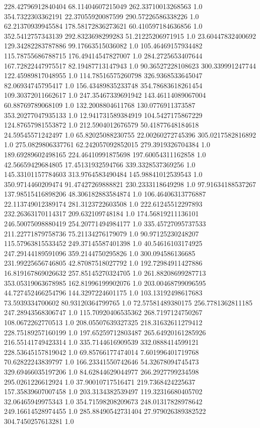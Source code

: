 228.42796912840404	68.11404607215049	262.33710013268563	1.0
354.7322303362191	22.37055920087599	290.57226586338226	1.0
62.21370939945584	178.58172836273621	60.410597184636856	1.0
352.5412757343139	292.8323698299283	51.21225206971915	1.0
23.60447832400692	129.34282283787886	99.17663515036082	1.0
105.46469157934482	115.78755686788715	176.49414547827007	1.0
284.2725653407644	167.72822447975517	82.19487713147943	1.0
90.36527228108623	300.339991247744	122.45989817048955	1.0
114.78516575260798	326.9368533645047	82.06934745795417	1.0
156.43489835233748	354.78683618261454	109.30372011662617	1.0
247.35467339691942	143.46114089067004	60.88769789068109	1.0
132.2008804611768	130.0776911373587	353.20277047935133	1.0
12.941731589384919	104.5427175867229	124.87657981553872	1.0
212.5904012676579	50.41877648184618	24.59545571242497	1.0
65.82025088230755	22.00260272745396	305.0217582816892	1.0
275.0829806337761	62.242057092852015	279.3919326704384	1.0
189.69289602498165	224.46410991875698	197.60054311162858	1.0
42.56659429684805	17.45131932594766	339.3328537369256	1.0
145.33101157784603	313.9764583490484	145.98841012539543	1.0
350.9714460209474	91.47427269888821	230.2333118649298	1.0
97.91634188537267	137.98515416898206	48.306182883584874	1.0
106.46406313776887	22.113749012389174	281.3123722603508	1.0
222.61245512297893	232.26363170114317	209.632109748184	1.0
174.56819211136101	246.50075098880419	254.20771494984177	1.0
335.45727095737533	211.22771879758736	75.21134276179079	1.0
90.97125230248207	115.57963815533452	249.37145587401398	1.0
40.54616103174925	247.29144189591096	359.2144750295826	1.0
300.094586136685	231.99225656746805	42.87087518027792	1.0
192.72984911427886	16.819167869026632	257.85145270324705	1.0
261.88208699287713	353.05319063678985	162.81996199902076	1.0
203.00468799096595	44.727452466254796	144.3297224601175	1.0
103.13192498617683	73.5939334700602	80.93120364799765	1.0
72.57581489380175	256.7781362811185	247.28943568306747	1.0
115.70920406535362	268.7197124750267	108.0672262770513	1.0
208.05507639327325	218.31632611279412	228.75189257160199	1.0
197.65259712803487	265.64920161285926	216.55141749423314	1.0
335.7144616909539	332.0888414599121	228.53645157819042	1.0
69.85766177474014	7.601996401719768	70.62822243839797	1.0
166.23341550742646	54.32678094745473	329.69466035197206	1.0
84.62844629044977	266.2927799234598	295.0261226612924	1.0
37.90010717516471	219.7368424225637	157.35839607007458	1.0
203.3134382539497	119.32316680405702	32.06465949975343	1.0
354.71598208209673	248.01317828978642	249.16614528974455	1.0
285.88490542731404	27.979026389382522	304.7450257613281	1.0
